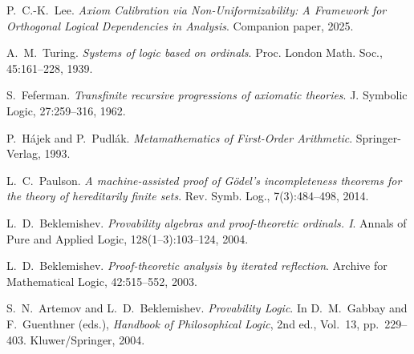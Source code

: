 \documentclass[11pt]{article}
\begin{document}
\begin{thebibliography}{10}

P.~C.-K.~Lee.
\emph{Axiom Calibration via Non-Uniformizability: A Framework for Orthogonal Logical Dependencies in Analysis}.
Companion paper, 2025.

A.~M.~Turing.
\emph{Systems of logic based on ordinals}.
Proc. London Math. Soc., 45:161--228, 1939.

S.~Feferman.
\emph{Transfinite recursive progressions of axiomatic theories}.
J. Symbolic Logic, 27:259--316, 1962.

P.~Hájek and P.~Pudlák.
\emph{Metamathematics of First-Order Arithmetic}.
Springer-Verlag, 1993.

L.~C.~Paulson.
\emph{A machine-assisted proof of Gödel's incompleteness theorems for the theory of hereditarily finite sets}.
Rev. Symb. Log., 7(3):484--498, 2014.

L.~D.~Beklemishev.
\emph{Provability algebras and proof-theoretic ordinals. I}.
Annals of Pure and Applied Logic, 128(1--3):103--124, 2004.

L.~D.~Beklemishev.
\emph{Proof-theoretic analysis by iterated reflection}.
Archive for Mathematical Logic, 42:515--552, 2003.

S.~N.~Artemov and L.~D.~Beklemishev.
\emph{Provability Logic}.
In D.~M.~Gabbay and F.~Guenthner (eds.), \emph{Handbook of Philosophical Logic}, 2nd ed., Vol.~13, pp.~229--403.
Kluwer/Springer, 2004.

\end{thebibliography}
\end{document}
